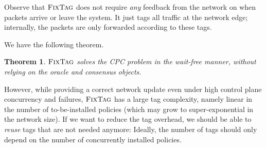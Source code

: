 \documentclass[11pt,pdftex,letter]{article}
\newcommand{\CPO}{\textsc{FixTag}}
\newcommand{\ie}{{\it i.e.}}
\newcommand{\pknote}[1]{\textcolor{heraldBlue}{\small \bf [PK: #1]}}
\newcommand{\pknote}[1]{}
\newcommand{\ignore}[1]{}
\newtheorem{theorem}{Theorem}
\newenvironment{proof}[1][Proof]{\noindent\textbf{#1.} }{\hfill $\Box$\\[2mm]}
\begin{document}
%
%
Observe that $\CPO$ does not require \emph{any} feedback from
the network on when packets arrive or leave the system. It just tags
all traffic at the network edge;
internally, the packets are only forwarded
according to these tags.

We have the following theorem.
\begin{theorem}\label{thm:tags}
$\CPO$ solves the CPC problem in the wait-free manner, without
  relying on the oracle and consensus objects.
\end{theorem}


However, while providing a correct network update even under high
control plane concurrency and failures, $\CPO$ has a large
tag complexity, namely linear in the number of to-be-installed
policies (which may grow to super-exponential in the network size).
If we want to reduce the tag overhead, we should be able to
\emph{reuse} tags that are not needed anymore:
Ideally, the number of tags should only depend on the number of concurrently installed policies.
\end{document}
